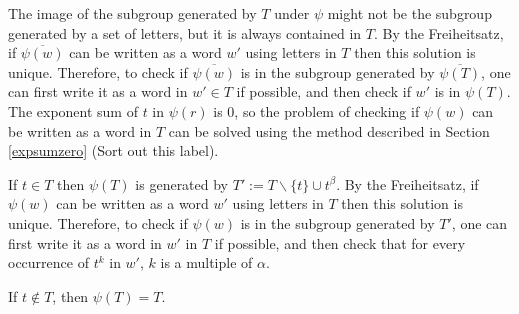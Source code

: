 \documentclass[12pt]{article} %
\theoremstyle{definition}
\theoremstyle{definition}
\theoremstyle{definition}
\theoremstyle{definition}
\theoremstyle{definition}
\newtheorem{defn}[theorem]{Definition}
\theoremstyle{definition}
\begin{document}
The image of the subgroup generated
by $T$ under $\psi$ might not be the subgroup generated by a set of letters, but it is
always contained in $T$.
By the Freiheitsatz, if $\overline{\psi(w)}$ can be written
as a word $w'$ using letters in $T$ then this solution is unique.
Therefore, to check if $\overline{\psi(w)}$ is in the subgroup generated by
$\overline{\psi(T)}$, one can first write it as a word in $w' \in T $ if possible,
and then check if $w'$ is in $\psi(T)$.
The exponent sum of $t$ in $\psi(r)$ is $0$, so the problem of checking
if $\psi(w)$ can be written as a word in $T$ can be solved using
the method described in Section \ref{expsumzero} (Sort out this label).

If $t \in T$ then $\psi(T)$ is generated by
$T' := T \backslash \{t\} \cup t^\beta$. By the Freiheitsatz, if $\psi(w)$ can be written
as a word $w'$ using letters in $T$ then this solution is unique. Therefore,
to check if $\psi(w)$ is in the subgroup generated by $T'$, one can first
write it as a word in $w'$ in $T$ if possible, and then check that for every
occurrence of $t^k$ in $w'$, $k$ is a multiple of $\alpha$.

If $t \notin T$, then  $\psi(T) = T$.






\end{document}
